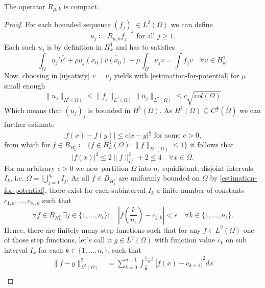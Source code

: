 \begin{theorem} \label{3.1:thm-Rmuk.isCompact}
	The operator $R_{\mu, k}$ is compact.

	\begin{proof}
	For each bounded sequence $(f_{j})_{j} \in L^{2}(\Omega)$ we can define
		\[ u_{j} \coloneqq R_{\mu, k} f_{j} \quad \text{ for all } j \geq 1. \]
	Each such $u_{j}$ is by definition in $H^{1}_{k}$ and has to satisfies 
		\begin{equation}
			\int_{\Omega} u_{j}' \overline{v'} + \rho u_{j}(x_{0}) \overline{v(x_{0})} - \mu \int_{\Omega} u_{j} \overline{v} = \int f_{j} \overline{v} \quad \forall v \in H^{1}_{k}. \label{ujsatisfy}
		\end{equation} 
	Now, choosing in \eqref{ujsatisfy} $v = u_{j}$ yields with \eqref{estimation-for-potential} for $\mu$ small enough
		\[  \| u_{j} \|_{H^{1}(\Omega)} \leq \| f_{j} \|_{L^{2}(\Omega)} \| u_{j} \|_{L^{2}(\Omega)} \leq c \sqrt{vol(\Omega)} \]
	Which means that $(u_{j})_{j}$ is bounded in $H^{1}(\Omega)$. As $H^1(\Omega) \subseteq C^{\frac{1}{2}}(\overline{\Omega})$ we can further estimate 
		\begin{equation}
			|f(x) - f(y)| \leq c |x - y|^{\frac{1}{2}} \text{ for some } c > 0, \label{eq:H1estimation}
		\end{equation}
	from which for $f \in B_{H^{1}_{k}} \coloneqq \{ f \in H^{1}_{k}(\Omega) : \| f \|_{H^{1}(\Omega)} \leq 1 \}$ it follows that 
		\[ |f(x)|^{2} \leq 2 \| f \|_{L^{2}}^{2} + 2 \leq 4 \quad \forall x \in \Omega. \]
	For an arbitrary $\epsilon > 0$ we now partition $\Omega$ into $n_{\epsilon}$ equidistant, disjoint intervals $I_{k}$, i.e. $\Omega = \bigcup_{j = 1}^{n_{\epsilon}} I_{j}$. As all $f \in B_{H^{1}_{k}}$ are uniformly bounded on $\Omega$ by \eqref{estimation-for-potential}, there exist for each subinterval $I_{k}$ a finite number of constants $c_{1, k}, \dotsc, c_{\nu_{\epsilon}, k}$ such that 
			$$ \forall f \in B_{H^{1}_{k}} ~\exists j \in \{1, \dotsc, \nu_{\epsilon} \}: \quad \left|f\left(\frac{k}{n_{\epsilon}}\right) - c_{j, k}\right| < \epsilon \quad \forall k \in \{ 1 , \dotsc, n_{\epsilon} \}. $$	
	Hence, there are finitely many step functions such that for any $f \in L^{2}(\Omega)$ one of those step functions, let's call it $g \in L^{2}(\Omega)$ with function value $c_{k}$ on sub interval $I_{k}$ for each $k \in \{ 1, \dotsc, n_{\epsilon} \}$, such that
		\begin{align*}
			\| f - g \|^{2}_{L^{2}(\Omega)} & = \sum_{k = 0}^{n-1} \int_{\frac{k}{n}}^{\frac{k+1}{n}} | f(x) - c_{k+1} |^{2} dx \\

\end{align*}
\end{proof}
\end{theorem}
